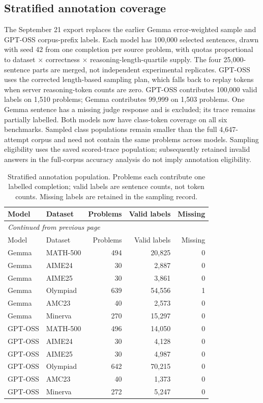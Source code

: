 \subsection{Stratified annotation coverage}
The September 21 export replaces the earlier Gemma error-weighted sample and GPT-OSS corpus-prefix labels. Each model has 100,000 selected sentences, drawn with seed 42 from one completion per source problem, with quotas proportional to dataset $\times$ correctness $\times$ reasoning-length-quartile supply. The four 25,000-sentence parts are merged, not independent experimental replicates. GPT-OSS uses the corrected length-based sampling plan, which falls back to replay tokens when server reasoning-token counts are zero.
GPT-OSS contributes 100,000 valid labels on 1,510 problems; Gemma contributes 99,999 on 1,503 problems. One Gemma sentence has a missing judge response and is excluded; its trace remains partially labelled. Both models now have class-token coverage on all six benchmarks. Sampled class populations remain smaller than the full 4,647-attempt corpus and need not contain the same problems across models. Sampling eligibility uses the saved scored-trace population; subsequently retained invalid answers in the full-corpus accuracy analysis do not imply annotation eligibility.
\begingroup\scriptsize\setlength{\tabcolsep}{4pt}
\begin{longtable}{@{}llrrr@{}}
\caption{Stratified annotation population. Problems each contribute one labelled completion; valid labels are sentence counts, not token counts. Missing labels are retained in the sampling record.}\label{tab:stratified-labels}\\
\toprule
Model & Dataset & Problems & Valid labels & Missing \\
\midrule\endfirsthead
\multicolumn{5}{l}{\textit{Continued from previous page}}\\
\toprule
Model & Dataset & Problems & Valid labels & Missing \\
\midrule\endhead
\bottomrule\endfoot
Gemma & MATH-500 & 494 & 20,825 & 0 \\
Gemma & AIME24 & 30 & 2,887 & 0 \\
Gemma & AIME25 & 30 & 3,861 & 0 \\
Gemma & Olympiad & 639 & 54,556 & 1 \\
Gemma & AMC23 & 40 & 2,573 & 0 \\
Gemma & Minerva & 270 & 15,297 & 0 \\
GPT-OSS & MATH-500 & 496 & 14,050 & 0 \\
GPT-OSS & AIME24 & 30 & 4,128 & 0 \\
GPT-OSS & AIME25 & 30 & 4,987 & 0 \\
GPT-OSS & Olympiad & 642 & 70,215 & 0 \\
GPT-OSS & AMC23 & 40 & 1,373 & 0 \\
GPT-OSS & Minerva & 272 & 5,247 & 0 \\
\end{longtable}\endgroup

